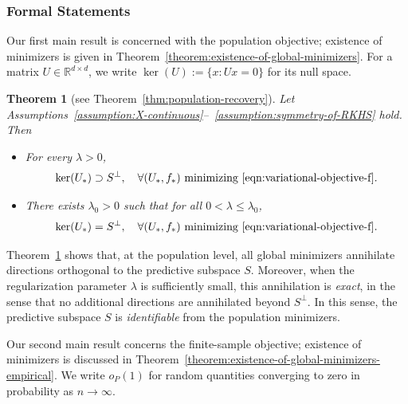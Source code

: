 \documentclass[sn-mathphys-num]{sn-jnl}%
\numberwithin{equation}{section}
\newcommand{\R}{\mathbb{R}}
\theoremstyle{thmstyleone}%
\newtheorem{theorem}{Theorem}%
\theoremstyle{thmstyletwo}%
\theoremstyle{thmstylethree}%
\begin{document}
\subsubsection{Formal Statements} 
\indent\indent
Our first main result is concerned with the population objective; existence of minimizers 
is given in Theorem~\ref{theorem:existence-of-global-minimizers}. For a matrix $U \in \R^{d \times d}$, 
we write $\ker(U):=\{x: Ux = 0\}$ for its null space. 

\vspace{.5em} 
\begin{theorem}[see Theorem~\ref{thm:population-recovery}]
\label{theorem:population-result-intro}
Let Assumptions~\ref{assumption:X-continuous}--~\ref{assumption:symmetry-of-RKHS} 
hold.  Then \vspace{.5em} 
\begin{itemize}
\item[$\mathsf{(a)}$] 
For every $\lambda > 0$, 
\begin{equation*}
	\ker(U_*) \supset S^\perp,~~~\forall (U_*, f_*)~\text{minimizing~\eqref{eqn:variational-objective-f}}.
\end{equation*} 
\vspace{0em} 
\item[$\mathsf{(b)}$] 
There exists $\lambda_0 > 0$ such that for all $0 < \lambda \le \lambda_0$,
\begin{equation*}
	\ker(U_*) = S^\perp,~~~\forall (U_*, f_*)~\text{minimizing~\eqref{eqn:variational-objective-f}}.
\end{equation*} 
\end{itemize}
\end{theorem} 

Theorem~\ref{theorem:population-result-intro} shows that, at the population level, all global minimizers annihilate directions orthogonal to the predictive subspace $S$. Moreover, when the regularization parameter $\lambda$ is sufficiently small, this annihilation is \emph{exact}, in the sense that no additional directions are annihilated beyond $S^\perp$. In this sense, the predictive subspace $S$ is \emph{identifiable} from the population minimizers.


Our second main result concerns the finite-sample objective; existence of minimizers is discussed in
Theorem~\ref{theorem:existence-of-global-minimizers-empirical}. We write $o_P(1)$ for random quantities
converging to zero in probability as $n \to \infty$.
\end{document}
